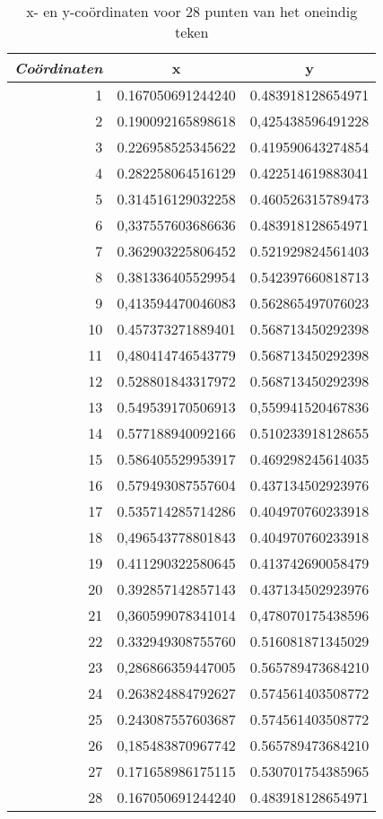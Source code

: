 \documentclass[10pt,a4paper]{article}
\begin{document}
\begin{table}[h!]
\begin{center}
\begin{tabular}{r||c|c|}
\textit{Co\"ordinaten} & \textbf{x} & \textbf{y}\\ \hline
1& 0.167050691244240 & 0.483918128654971\\
2& 0.190092165898618 & 0,425438596491228\\
3& 0.226958525345622 & 0.419590643274854\\
4& 0.282258064516129 & 0.422514619883041\\ 
5& 0.314516129032258 & 0.460526315789473\\ 
6& 0,337557603686636 & 0.483918128654971\\ 
7& 0.362903225806452 & 0.521929824561403\\
8& 0.381336405529954 & 0.542397660818713\\
9& 0,413594470046083 & 0.562865497076023\\
10& 0.457373271889401 & 0.568713450292398\\
11& 0,480414746543779 & 0.568713450292398\\
12& 0.528801843317972 & 0.568713450292398\\
13& 0.549539170506913 & 0,559941520467836\\ 
14& 0.577188940092166 & 0.510233918128655\\ 
15& 0.586405529953917 & 0.469298245614035\\ 
16& 0.579493087557604 & 0.437134502923976\\ 
17& 0.535714285714286 & 0.404970760233918\\ 
18& 0,496543778801843 & 0.404970760233918\\
19& 0.411290322580645 & 0.413742690058479\\ 
20& 0.392857142857143 & 0.437134502923976\\ 
21& 0,360599078341014 & 0,478070175438596\\ 
22& 0.332949308755760 & 0.516081871345029\\ 
23& 0,286866359447005 & 0.565789473684210\\ 
24& 0.263824884792627 & 0.574561403508772\\
25& 0.243087557603687 & 0.574561403508772\\ 
26& 0,185483870967742 & 0.565789473684210\\
27& 0.171658986175115 & 0.530701754385965\\  
28& 0.167050691244240 & 0.483918128654971\\ \hline
\end{tabular}
\end{center}
\caption{x- en y-co\"ordinaten voor 28 punten van het oneindig teken}
\label{tab:coordinaten}
\end{table}
\end{document}
